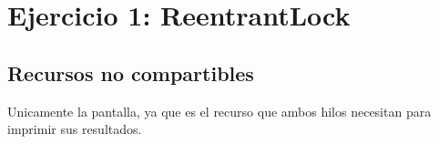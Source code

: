 \documentclass[a4paper,12pt,titlepage,oneside]{article}
\begin{document}
\section{Ejercicio 1: ReentrantLock}

    \subsection{Recursos no compartibles}
    Unicamente la pantalla, ya que es el recurso que ambos hilos necesitan para imprimir sus resultados. 
\end{document}
